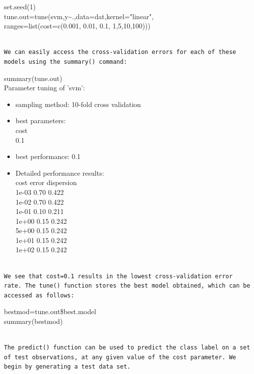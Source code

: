 \documentclass[10pt]{article}
\begin{document}
\begin{displayquote}
set.seed(1)\\
tune.out=tune(svm,y\~{}.,data=dat,kernel="linear",\\
ranges=list(cost=c(0.001, 0.01, 0.1, 1,5,10,100)))
\end{displayquote}

\begin{verbatim}

We can easily access the cross-validation errors for each of these models using the summary() command:
\end{verbatim}

\begin{displayquote}
summary(tune.out)\\
Parameter tuning of 'svm':
\end{displayquote}

\begin{itemize}
  \item sampling method: 10-fold cross validation
  \item best parameters:\\
cost\\
0.1
  \item best performance: 0.1
  \item Detailed performance results:\\
cost error dispersion\\
1e-03 0.70 0.422\\
1e-02 0.70 0.422\\
1e-01 0.10 0.211\\
1e+00 0.15 0.242\\
5e+00 0.15 0.242\\
1e+01 0.15 0.242\\
1e+02 0.15 0.242
\end{itemize}

\begin{verbatim}

We see that cost=0.1 results in the lowest cross-validation error rate. The tune() function stores the best model obtained, which can be accessed as follows:
\end{verbatim}

\begin{displayquote}
bestmod=tune.out\$best.model\\
summary(bestmod)
\end{displayquote}

\begin{verbatim}

The predict() function can be used to predict the class label on a set of test observations, at any given value of the cost parameter. We begin by generating a test data set.
\end{verbatim}
\end{document}
